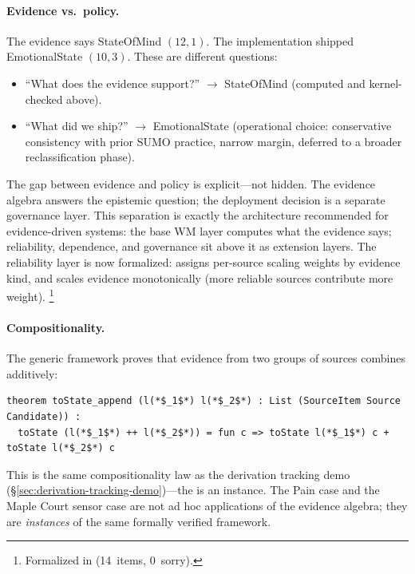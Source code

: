 \documentclass[11pt,openany]{report}
\begin{document}
\paragraph{Evidence vs.\ policy.}
The evidence says StateOfMind $(12, 1)$.  The implementation
shipped EmotionalState $(10, 3)$.  These are different questions:
\begin{itemize}
\item ``What does the evidence support?'' $\to$ StateOfMind
  (computed and kernel-checked above).
\item ``What did we ship?'' $\to$ EmotionalState (operational
  choice: conservative consistency with prior SUMO practice,
  narrow margin, deferred to a broader reclassification phase).
\end{itemize}
The gap between evidence and policy is explicit---not hidden.
The evidence algebra answers the epistemic question; the
deployment decision is a separate governance layer.  This
separation is exactly the architecture recommended for
evidence-driven systems: the base WM layer computes what the
evidence says; reliability, dependence, and governance sit above
it as extension layers.  The reliability layer is now formalized:
 assigns per-source scaling weights by
evidence kind, and  scales evidence
monotonically (more reliable sources contribute more weight).%
\footnote{Formalized in
(14~items, 0~sorry).}

\paragraph{Compositionality.}
The generic framework proves that evidence from two groups of
sources combines additively:

\begin{lstlisting}[language={}]
theorem toState_append (l(*$_1$*) l(*$_2$*) : List (SourceItem Source Candidate)) :
  toState (l(*$_1$*) ++ l(*$_2$*)) = fun c => toState l(*$_1$*) c + toState l(*$_2$*) c
\end{lstlisting}

\noindent
This is the same compositionality law as the derivation tracking
demo (\S\ref{sec:derivation-tracking-demo})---the
 is an  instance.
The Pain case and the Maple Court sensor case are not ad hoc
applications of the evidence algebra; they are \emph{instances} of
the same formally verified framework.
\end{document}
